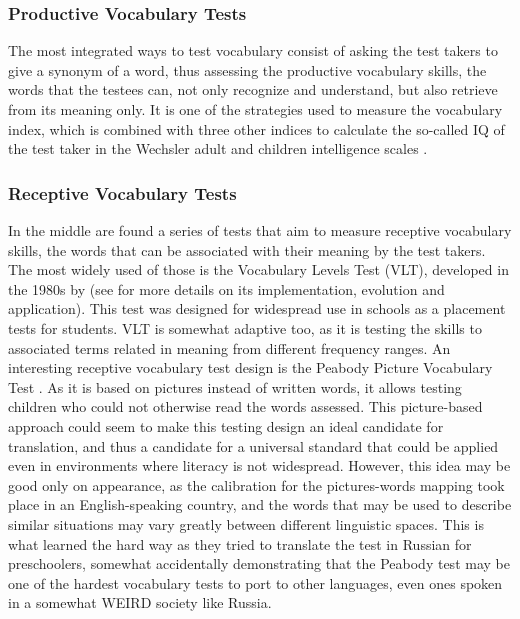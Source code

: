         \subsubsection{Productive Vocabulary Tests}
The most integrated ways to test vocabulary consist of asking the test takers to give a synonym of a word, thus assessing the productive vocabulary skills, the words that the testees can, not only recognize and understand, but also retrieve from its meaning only. It is one of the strategies used to measure the vocabulary index, which is combined with three other indices to calculate the so-called IQ of the test taker in the Wechsler adult and children intelligence scales \parencite{wechsler_wechsler_nodate}.
        \subsubsection{Receptive Vocabulary Tests}
In the middle are found a series of tests that aim to measure receptive vocabulary skills, the words that can be associated with their meaning by the test takers. The most widely used of those is the Vocabulary Levels Test (VLT), developed in the 1980s by \textcite{nation_teaching_1990} (see \cite{kremmel_vocabulary_2017} for more details on its implementation, evolution and application). This test was designed for widespread use in schools as a placement tests for students. VLT is somewhat adaptive too, as it is testing the skills to associated terms related in meaning from different frequency ranges. An interesting receptive vocabulary test design is the Peabody Picture Vocabulary Test \parencite{dunn_ppvt-4_nodate}. As it is based on pictures instead of written words, it allows testing children who could not otherwise read the words assessed. This picture-based approach could seem to make this testing design an ideal candidate for translation, and thus a candidate for a universal standard that could be applied even in environments where literacy is not widespread. However, this idea may be good only on appearance, as the calibration for the pictures-words mapping took place in an English-speaking country, and the words that may be used to describe similar situations may vary greatly between different linguistic spaces. This is what \textcite{kartushina_use_2022} learned the hard way as they tried to translate the test in Russian for preschoolers, somewhat accidentally demonstrating that the Peabody test may be one of the hardest vocabulary tests to port to other languages, even ones spoken in a somewhat WEIRD society like Russia.
